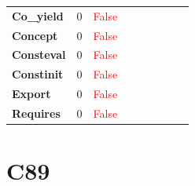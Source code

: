 \documentclass{article}
\begin{document}
\begin{xltabular}{\textwidth}{lcccccccc}
\textbf{{\fontsize{10}{12}\selectfont Co\_yield}}& 0&\textcolor{red}{False} \\[0.5ex]
\textbf{{\fontsize{10}{12}\selectfont Concept}}& 0&\textcolor{red}{False} \\[0.5ex]
\textbf{{\fontsize{10}{12}\selectfont Consteval}}& 0&\textcolor{red}{False} \\[0.5ex]
\textbf{{\fontsize{10}{12}\selectfont Constinit}}& 0&\textcolor{red}{False} \\[0.5ex]
\textbf{{\fontsize{10}{12}\selectfont Export}}& 0&\textcolor{red}{False} \\[0.5ex]
\textbf{{\fontsize{10}{12}\selectfont Requires}}& 0&\textcolor{red}{False} \\[0.5ex]
\bottomrule
\end{xltabular}
\newpage
\section{C89}
\end{document}
